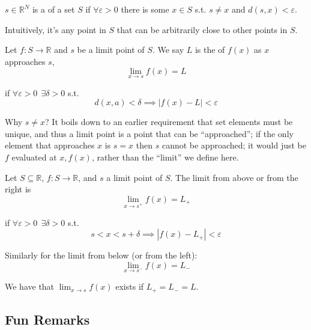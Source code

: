 \documentclass{article}
\begin{document}
\begin{definition}
  $s \in \mathbb{R}^N$ is a  of a set $S$ if $\forall \varepsilon > 0$ there is some $x \in S$ s.t. $s \ne x$ and $d(s, x) < \varepsilon$.
\end{definition}

Intuitively, it's any point in $S$ that can be arbitrarily close to other points in $S$.
\begin{definition}
  Let $f: S \to \mathbb{R}$ and $s$ be a limit point of $S$. We say $L$ is the  of $f(x)$ as $x$ approaches $s$,
  \[
    \lim_{x \to s} f(x) = L
  \]

  if $\forall \varepsilon > 0 ~~ \exists \delta > 0$ s.t.
  \[
    d(x, a) < \delta \implies |f(x) - L| < \varepsilon
  \]
\end{definition}

\begin{remark}
  Why $s \ne x$? It boils down to an earlier requirement that set elements must be unique, and thus a limit point is a point that can be ``approached''; if the only element that approaches $x$ is $s = x$ then $s$ cannot be approached; it would just be $f$ evaluated at $x, f(x)$, rather than the ``limit'' we define here.
\end{remark}

\begin{definition}
  Let $S \subseteq \mathbb{R}$, $f: S \to \mathbb{R}$, and $s$ a limit point of $S$. The limit from above or from the right is
  \[
    \lim_{x \to s^+} f(x) = L_+
  \]

  if $\forall \varepsilon > 0 ~~ \exists \delta > 0$ s.t.
  \[
    s < x < s + \delta
    \implies
    |f(x) - L_+| < \varepsilon
  \]

  Similarly for the limit from below (or from the left):
  \[
    \lim_{x \to s^-} f(x) = L_-
  \]

  We have that $\lim_{x \to s} f(x)$ exists if $L_{+} = L_{-} = L$.
\end{definition}

\subsection{Fun Remarks}
\label{sub:fun_remarks}
\end{document}
